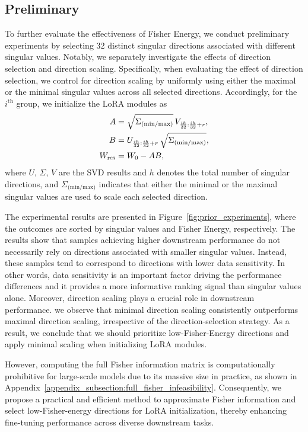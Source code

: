 \documentclass{article}
\theoremstyle{plain}
\theoremstyle{definition}
\theoremstyle{remark}
\begin{document}
\subsection{Preliminary}
\label{subsec:preliminary}

To further evaluate the effectiveness of Fisher Energy, we conduct preliminary experiments by selecting 32 distinct singular directions associated with different singular values. Notably, we separately investigate the effects of direction selection and direction scaling. Specifically, when evaluating the effect of direction selection, we control for direction scaling by uniformly using either the maximal or the minimal singular values across all selected directions. 
Accordingly, for the $i^{\text{th}}$ group, we initialize the LoRA modules as
\begin{align}
  A = {} & \sqrt{\Sigma_{\text{(min/max)}}} \, V_{\frac{i h}{32} : \frac{ih}{32}+r}, \notag\\
  B = {} & U_{\frac{i h}{32} : \frac{ih}{32}+r} \, \sqrt{\Sigma_{\text{(min/max)}}}, \notag\\ 
  W_{\text{res}} = {} & W_0 - AB,
\end{align}
where $U$, $\Sigma$, $V$ are the SVD results and $h$ denotes the total number of singular directions, and $\Sigma_{\text{(min/max)}}$ indicates that either the minimal or the maximal singular values are used to scale each selected direction.

The experimental results are presented in Figure~\ref{fig:prior_experiments}, where the outcomes are sorted by singular values and Fisher Energy, respectively. The results show that samples achieving higher downstream performance do not necessarily rely on directions associated with smaller singular values. Instead, these samples tend to correspond to directions with lower data sensitivity. In other words, data sensitivity is an important factor driving the performance differences and it provides a more informative ranking signal than singular values alone. Moreover, direction scaling plays a crucial role in downstream performance. we observe that minimal direction scaling consistently outperforms maximal direction scaling, irrespective of the direction-selection strategy. As a result, we conclude that we should prioritize low-Fisher-Energy directions and apply minimal scaling when initializing LoRA modules.

However, computing the full Fisher information matrix is computationally prohibitive for large-scale models due to its massive size in practice, as shown in Appendix~\ref{appendix_subsection:full_fisher_infeasibility}. Consequently, we propose a practical and efficient method to approximate Fisher information and select low-Fisher-energy directions for LoRA initialization, thereby enhancing fine-tuning performance across diverse downstream tasks.
\end{document}
